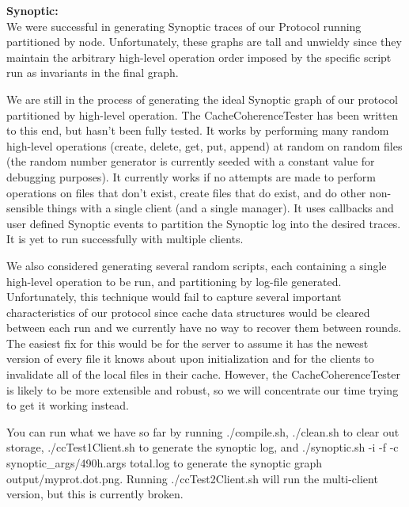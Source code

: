 \documentclass[11pt]{article}
\begin{document}
\textbf{Synoptic:} \\

We were successful in generating Synoptic traces of our Protocol running partitioned by node. Unfortunately, these graphs are tall and unwieldy since they
maintain the arbitrary high-level operation order imposed by the specific script run as invariants in the final graph.

We are still in the process of generating the ideal Synoptic graph of our protocol partitioned by high-level operation. The CacheCoherenceTester has been written to this end, but hasn't been fully tested.
It works by performing many random high-level operations (create, delete, get, put, append) at random on random files (the random number generator is currently seeded with a constant value for debugging purposes).
 It currently works if no attempts are made to perform operations on files that don't exist, create files that do exist, and do other non-sensible things with a single client (and a single manager).
It uses callbacks and user defined Synoptic events to partition the Synoptic log into the desired traces. It is yet to run successfully with multiple clients.

We also considered generating several random scripts, each containing a single high-level operation to be run, and partitioning by log-file generated. Unfortunately, this technique
would fail to capture several important characteristics of our protocol since cache data structures would be cleared between each run and we currently have no way to recover them between rounds.
The easiest fix for this would be for the server to assume it has the newest version of every file it knows about upon initialization and for the clients to invalidate all of the local files in their cache.
However, the CacheCoherenceTester is likely to be more extensible and robust, so we will concentrate our time trying to get it working instead.

You can run what we have so far by running ./compile.sh, ./clean.sh to clear out storage, ./ccTest1Client.sh to generate the synoptic log, and ./synoptic.sh -i -f -c synoptic\_args/490h.args total.log to generate the synoptic graph output/myprot.dot.png. Running ./ccTest2Client.sh will run the multi-client version, but this is currently broken. \\
\end{document}
